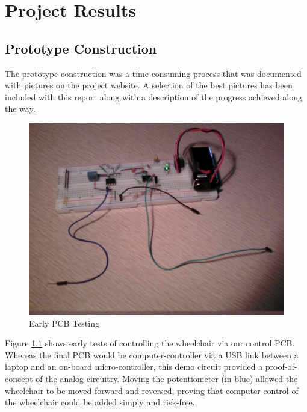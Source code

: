 \documentclass[oneside,final,a4paper]{report}
\begin{document}
\chapter{Project Results}

\section{Prototype Construction}

The prototype construction was a time-consuming process that was documented with pictures on the project website. A selection of the best pictures has been included with this report along with a description of the progress achieved along the way.

\begin{figure}[hbt]
 \centering
 \includegraphics[scale=0.35]{test_circuit}
 \caption{Early PCB Testing}
 \label{fig:testing_PCB}
\end{figure}

Figure \ref{fig:testing_PCB} shows early tests of controlling the wheelchair via our control PCB. Whereas the final PCB would be computer-controller via a USB link between a laptop and an on-board micro-controller, this demo circuit provided a proof-of-concept of the analog circuitry. Moving the potentiometer (in blue) allowed the wheelchair to be moved forward and reversed, proving that computer-control of the wheelchair could be added simply and risk-free.
\end{document}
